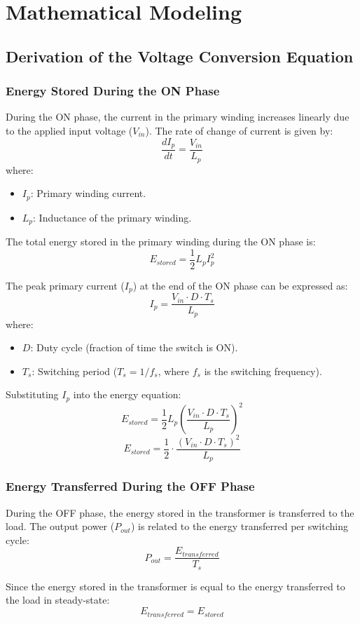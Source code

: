 \section{Mathematical Modeling}
\subsection{Derivation of the Voltage Conversion Equation}
\subsubsection*{Energy Stored During the ON Phase}
During the ON phase, the current in the primary winding increases linearly due to the applied input voltage ($V_{in}$). The rate of change of current is given by:
\[
\frac{dI_p}{dt} = \frac{V_{in}}{L_p}
\]
where:
\begin{itemize}
    \item $I_p$: Primary winding current.
    \item $L_p$: Inductance of the primary winding.
\end{itemize}

The total energy stored in the primary winding during the ON phase is:
\[
E_{stored} = \frac{1}{2} L_p I_p^2
\]

The peak primary current ($I_p$) at the end of the ON phase can be expressed as:
\[
I_p = \frac{V_{in} \cdot D \cdot T_s}{L_p}
\]
where:
\begin{itemize}
    \item $D$: Duty cycle (fraction of time the switch is ON).
    \item $T_s$: Switching period ($T_s = 1/f_s$, where $f_s$ is the switching frequency).
\end{itemize}

Substituting $I_p$ into the energy equation:
\[
E_{stored} = \frac{1}{2} L_p \left(\frac{V_{in} \cdot D \cdot T_s}{L_p}\right)^2
\]
\[
E_{stored} = \frac{1}{2} \cdot \frac{(V_{in} \cdot D \cdot T_s)^2}{L_p}
\]

\subsubsection*{Energy Transferred During the OFF Phase}
During the OFF phase, the energy stored in the transformer is transferred to the load. The output power ($P_{out}$) is related to the energy transferred per switching cycle:
\[
P_{out} = \frac{E_{transferred}}{T_s}
\]

Since the energy stored in the transformer is equal to the energy transferred to the load in steady-state:
\[
E_{transferred} = E_{stored}
\]

